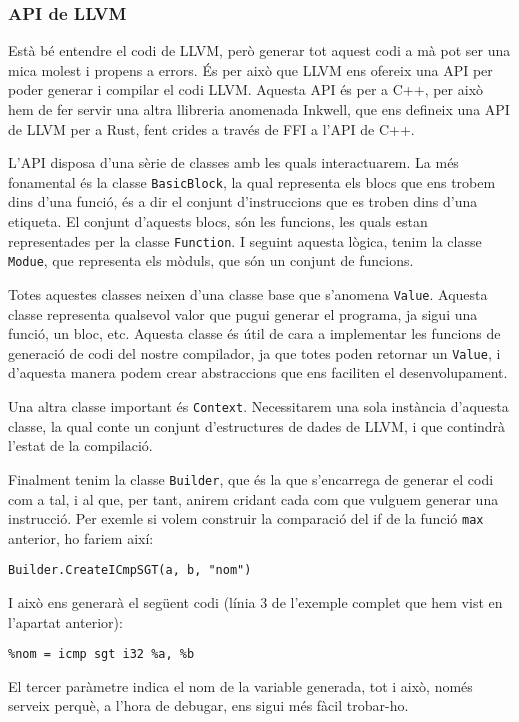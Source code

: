 ﻿\documentclass{article}
\begin{document}
\subsubsection{API de LLVM}
Està bé entendre el codi de LLVM, però generar tot aquest codi a mà pot ser una
mica molest i propens a errors. És per això que LLVM ens ofereix una API per
poder generar i compilar el codi LLVM. Aquesta API és per a C++, per això hem de 
fer servir una altra llibreria anomenada Inkwell, que ens defineix una API de 
LLVM per a Rust, fent crides a través de FFI a l'API de C++.

L'API disposa d'una sèrie de classes amb les quals interactuarem. La més 
fonamental és la classe \texttt{BasicBlock}, la qual representa els blocs que 
ens trobem dins d'una funció, és a dir el conjunt d'instruccions que es troben
dins d'una etiqueta. El conjunt d'aquests blocs, són les funcions, les quals
estan representades per la classe \texttt{Function}. I seguint aquesta lògica,
tenim la classe \texttt{Modue}, que representa els mòduls, que són un conjunt de
funcions.

Totes aquestes classes neixen d'una classe base que s'anomena \texttt{Value}. 
Aquesta classe representa qualsevol valor que pugui generar el programa, ja 
sigui una funció, un bloc, etc. Aquesta classe és útil de cara a implementar
les funcions de generació de codi del nostre compilador, ja que totes poden 
retornar un \texttt{Value}, i d'aquesta manera podem crear abstraccions que ens
faciliten el desenvolupament.

Una altra classe important és \texttt{Context}. Necessitarem una sola instància
d'aquesta classe, la qual conte un conjunt d'estructures de dades de LLVM, i que
contindrà l'estat de la compilació.

Finalment tenim la classe \texttt{Builder}, que és la que s'encarrega de generar
el codi com a tal, i al que, per tant, anirem cridant cada com que vulguem
generar una instrucció. Per exemle si volem construir la comparació del if de la
funció \texttt{max} anterior, ho fariem així: 

\texttt{Builder.CreateICmpSGT(a, b, "nom")}

I això ens generarà el següent codi (línia 3 de l'exemple complet que hem vist 
en l'apartat anterior):

\texttt{\%nom = icmp sgt i32 \%a, \%b}

El tercer paràmetre indica el nom de la variable generada, tot i això, només 
serveix perquè, a l'hora de debugar, ens sigui més fàcil trobar-ho.
\end{document}
